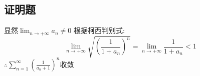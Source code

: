 \documentclass[a4paper,12pt]{ctexrep}
\begin{document}
\newpage

\subsection{证明题}
显然$\operatorname*{lim}_{n\rightarrow+\infty}a_{n}\neq0$
根据柯西判别式:
\begin{equation*}
	\operatorname*{lim}_{n\rightarrow+\infty}\sqrt{(\frac{1}{1+a_{n}})^{n}}=\operatorname*{lim}_{n\rightarrow+\infty}\frac{1}{1+a_{n}}  < 1
\end{equation*}
$\therefore \sum_{n=1}^\infty\left(\frac{1}{a_n+1}\right)^n$收敛
\end{document}
